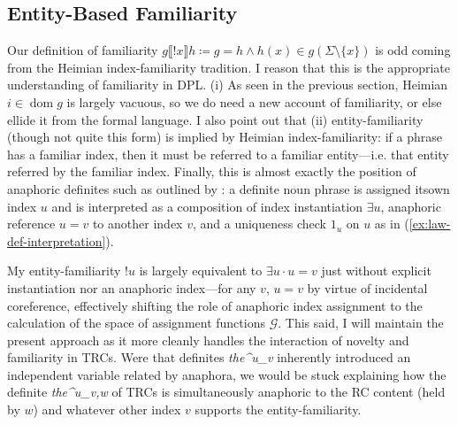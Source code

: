 \documentclass[11pt]{article}
\DeclareMathOperator{\dom}{dom}
\begin{document}
\subsection{Entity-Based Familiarity}
Our definition of familiarity \(g\llbracket ! x\rrbracket h \coloneqq g = h \land h(x) \in g(\Sigma \setminus \{x\})\) is odd coming from the Heimian index-familiarity tradition. I reason that this is the appropriate understanding of familiarity in DPL. (i) As seen in the previous section, Heimian \(i \in \dom g\) is largely vacuous, so we do need a new account of familiarity, or else ellide it from the formal language. I also point out that (ii) entity-familiarity (though not quite this form) is implied by Heimian index-familiarity: if a phrase has a familiar index, then it must be referred to a familiar entity---i.e. that entity referred by the familiar index. Finally, this is almost exactly the position of anaphoric definites such as outlined by \citet{lawWeNeedTwo2025}: a definite noun phrase is assigned itsown index \(u\) and is interpreted as a composition of index instantiation \(\exists u\), anaphoric reference \(u = v\) to another index \(v\), and a uniqueness check \(1_u\) on \(u\) as in (\ref{ex:law-def-interpretation}).

\begin{exe}
	\label{ex:law-def-interpretation}
\end{exe}

My entity-familiarity \(! u\) is largely equivalent to \(\exists u \cdot u = v\) just without explicit instantiation nor an anaphoric index---for any \(v\), \(u = v\) by virtue of incidental coreference, effectively shifting the role of anaphoric index assignment to the calculation of the space of assignment functions \(\mathcal{G}\). This said, I will maintain the present approach as it more cleanly handles the interaction of novelty and familiarity in TRCs. Were that definites \textit{the^u_v} inherently introduced an independent variable related by anaphora, we would be stuck explaining how the definite \textit{the^u_{v,w}} of TRCs is simultaneously anaphoric to the RC content (held by \(w\)) and whatever other index \(v\) supports the entity-familiarity.
\end{document}
